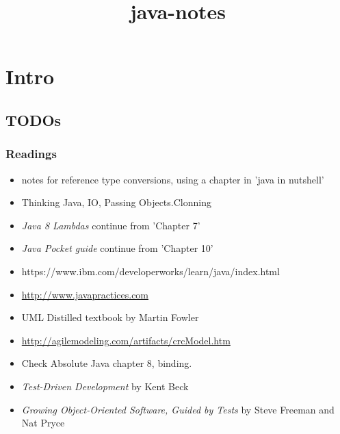 \documentclass{report}
\title{java-notes}
\begin{document}
\tableofcontents




\part{Intro}



\chapter{TODOs}


\section{Readings}
\begin{itemize}
	\item  notes for reference type conversions, using a chapter in 'java in nutshell'
	\item Thinking Java, IO, Passing Objects.Clonning
	\item \textit{Java 8 Lambdas} continue from 'Chapter 7'
	\item \textit{Java Pocket guide} continue from  'Chapter 10'
	\item https://www.ibm.com/developerworks/learn/java/index.html
  	\item \url{http://www.javapractices.com}
      
	\item UML Distilled textbook by Martin Fowler 
	\item \url{http://agilemodeling.com/artifacts/crcModel.htm}
	\item  Check Absolute Java chapter 8, binding.
	\item \textit{Test-Driven Development} by Kent Beck
	\item \textit{Growing Object-Oriented Software, Guided by Tests} by Steve Freeman and Nat Pryce 
\end{itemize}
\end{document}
